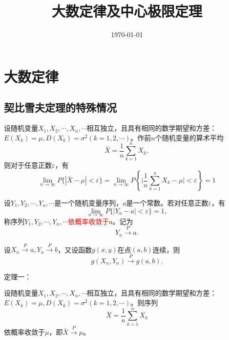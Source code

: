 \documentclass[12pt,a4paper]{article}
\title{大数定律及中心极限定理}
\author{}
\date{\today}
\begin{document}
\maketitle

\section{大数定律}
\subsection{契比雪夫定理的特殊情况}

设随机变量$X_1, X_2, \cdots, X_n, \cdots$相互独立，且具有相同的数学期望和方差：$E(X_k) = \mu, D(X_k) = \sigma^2 (k = 1, 2, \cdots)$。作前$n$个随机变量的算术平均
\begin{equation}
\bar{X} = \frac{1}{n} \sum_{k=1}^n X_k ,
\end{equation}
则对于任意正数$\varepsilon$，有
\begin{equation}
\lim_{n\rightarrow \infty} P\{|\bar{X} -\mu| < \varepsilon \} = \lim_{n\rightarrow \infty} P\left \{\bigg|\frac{1}{n} \sum_{k=1}^n X_k -\mu \bigg| < \varepsilon \right \} = 1
\end{equation}


设$Y_1, Y_2, \cdots, Y_n, \cdots$是一个随机变量序列，$a$是一个常数。若对任意正数$\varepsilon$，有
\begin{equation}
\lim_{n\rightarrow \infty} P\{|Y_n -a| < \varepsilon \}  = 1,
\end{equation}
称序列$Y_1, Y_2, \cdots, Y_n, \cdots$\textcolor{red}{依概率收敛于}$a$。记为
\begin{equation}
Y_n \stackrel{P}{\longrightarrow} a.
\end{equation}

设$X_n \stackrel{P}{\longrightarrow} a, Y_n \stackrel{P}{\longrightarrow} b$，又设函数$g(x,y)$在点$(a,b)$连续，则
\begin{equation}
g(X_n, Y_n) \stackrel{P}{\longrightarrow} g(a, b).
\end{equation}

定理一：

设随机变量$X_1, X_2, \cdots, X_n, \cdots$相互独立，且具有相同的数学期望和方差：$E(X_k) = \mu, D(X_k) = \sigma^2 (k = 1, 2, \cdots)$。则序列
\begin{equation}
\bar{X} = \frac{1}{n} \sum_{k=1}^n X_k
\end{equation}
依概率收敛于$\mu$，即$\bar{X} \stackrel{P}{\longrightarrow} \mu$。
\end{document}
